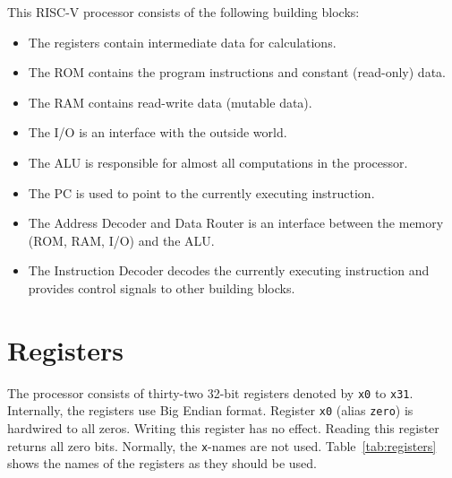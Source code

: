 \documentclass[12pt]{article}
\begin{document}
This RISC-V processor consists of the following building blocks:

\begin{itemize}
\item The registers contain intermediate data for calculations.
\item The ROM contains the program instructions and constant (read-only) data.
\item The RAM contains read-write data (mutable data).
\item The I/O is an interface with the outside world.
\item The ALU is responsible for almost all computations in the processor.
\item The PC is used to point to the currently executing instruction.
\item The Address Decoder and Data Router is an interface between the memory (ROM, RAM, I/O) and the ALU.
\item The Instruction Decoder decodes the currently executing instruction and provides control signals to other building blocks.
\end{itemize}

\section{Registers}
The processor consists of thirty-two 32-bit registers denoted by \texttt{x0} to \texttt{x31}. Internally, the registers use Big Endian format. Register \texttt{x0} (alias \texttt{zero}) is hardwired to all zeros. Writing this register has no effect. Reading this register returns all zero bits. Normally, the \texttt{x}-names are not used. Table~\ref{tab:registers} shows the names of the registers as they should be used.
\end{document}
